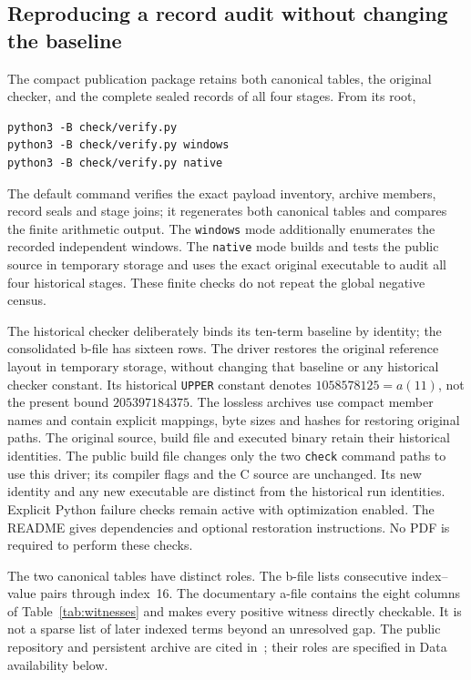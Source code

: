\documentclass[11pt,a4paper]{article}
\theoremstyle{definition}
\theoremstyle{remark}
\begin{document}
\subsection{Reproducing a record audit without changing the baseline}\label{sec:reproduce}
The compact publication package retains both canonical tables, the original
checker, and the complete sealed records of all four stages. From its root,
\begin{verbatim}
python3 -B check/verify.py
python3 -B check/verify.py windows
python3 -B check/verify.py native
\end{verbatim}
The default command verifies the exact payload inventory, archive members,
record seals and stage joins; it regenerates both canonical tables and
compares the finite arithmetic output. The \texttt{windows} mode additionally
enumerates the recorded independent windows. The \texttt{native} mode builds
and tests the public source in temporary storage and uses the exact original
executable to audit all four historical stages. These finite checks do not
repeat the global negative census.

The historical checker deliberately binds its ten-term baseline by identity;
the consolidated b-file has sixteen rows. The driver restores the original
reference layout in temporary storage, without changing that baseline or any
historical checker constant. Its historical \texttt{UPPER} constant denotes
$1058578125=a(11)$, not the present bound $205397184375$.
The lossless archives use compact member names and contain explicit mappings,
byte sizes and hashes for restoring original paths. The original source,
build file and executed binary retain their historical identities. The public
build file changes only the two \texttt{check} command paths to use this driver;
its compiler flags and the C source are unchanged. Its new identity and any
new executable are distinct from the historical run identities. Explicit
Python failure checks remain active with optimization enabled. The README
gives dependencies and optional restoration instructions. No PDF is required
to perform these checks.

The two canonical tables have distinct roles. The b-file lists consecutive
index--value pairs through index~16. The documentary a-file contains the
eight columns of Table~\ref{tab:witnesses} and makes every positive witness
directly checkable. It is not a sparse list of later indexed terms beyond
an unresolved gap. The public repository and persistent archive are cited in~\cite{project};
their roles are specified in Data availability below.
\end{document}
